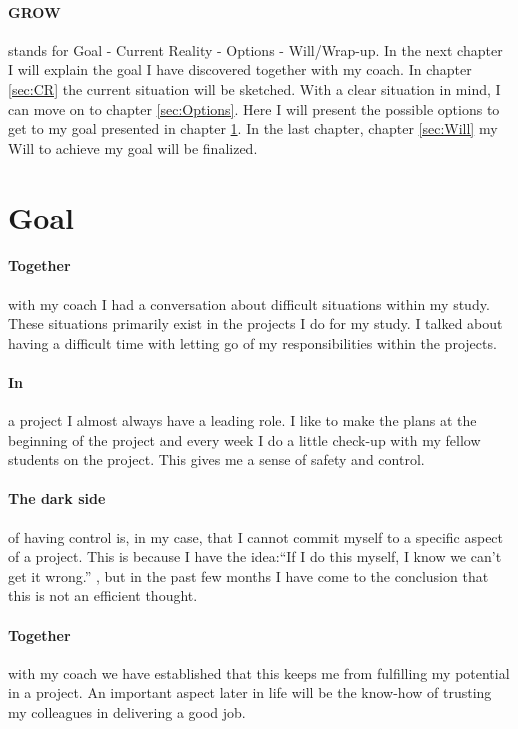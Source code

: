\documentclass[11pt]{article}
\begin{document}
	\paragraph{GROW} stands for Goal - Current Reality - Options - Will/Wrap-up. In the next chapter I will explain the goal I have discovered together with my coach. In chapter \ref{sec:CR} the current situation will be sketched. With a clear situation in mind, I can move on to chapter \ref{sec:Options}. Here I will present the possible options to get to my goal presented in chapter \ref{sec:Goals}. In the last chapter, chapter \ref{sec:Will} my Will to achieve my goal will be finalized. 
	
	\section{Goal}\label{sec:Goals}
	\paragraph{Together} with my coach I had a conversation about difficult situations within my study. These situations primarily exist in the projects I do for my study. I talked about having a difficult time with letting go of my responsibilities within the projects. 
	
	\paragraph{In} a project I almost always have a leading role. I like to make the plans at the beginning of the project and every week I do a little check-up with my fellow students on the project. This gives me a sense of safety and control. 
	
	\paragraph{The dark side} of having control is, in my case, that I cannot commit myself to a specific aspect of a project. This is because I have the idea:``If I do this myself, I know we can't get it wrong.'' , but in the past few months I have come to the conclusion that this is not an efficient thought. 
	
	\paragraph{Together} with my coach we have established that this keeps me from fulfilling my potential in a project. An important aspect later in life will be the know-how of trusting my colleagues in delivering a good job. 
	
\end{document}
